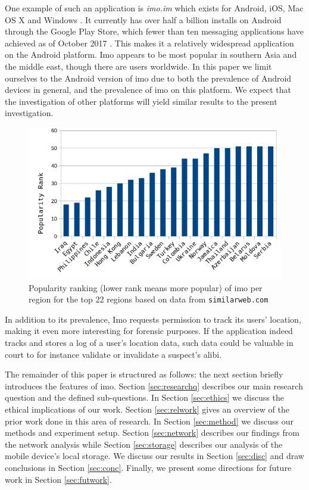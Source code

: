 \documentclass[conference]{IEEEtran}
\begin{document}
One example of such an application is {\it imo.im} which exists for Android,
iOS, Mac OS X and Windows \cite{imo}. It currently has over half a billion
installs on Android through the Google Play Store, which fewer than ten
messaging applications have achieved as of October 2017
\cite{wiki-gplay-popular}. This makes it a relatively widespread application on
the Android platform. Imo appears to be most popular in southern Asia and the
middle east, though there are users worldwide. In this paper we
limit ourselves to the Android version of imo due to both the prevalence of
Android devices in general, and the prevalence of imo on this platform. We
expect that the investigation of other platforms will yield similar results to
the present investigation.

\begin{figure}
	\includegraphics[width=\linewidth]{pop.png}
	\caption{Popularity ranking (lower rank means more popular) of imo per region for the top 22 regions based on data from \texttt{similarweb.com}}
	\label{fig:pop}
\end{figure}

In addition to its prevalence, Imo requests permission to track its users'
location, making it even more interesting for forensic purposes. If the
application indeed tracks and stores a log of a user's location data, such data
could be valuable in court to for instance validate or invalidate a suspect's
alibi.

The remainder of this paper is structured as follows: the next section briefly
introduces the features of imo. Section \ref{sec:researchq} describes our main
research question and the defined sub-questions. In Section \ref{sec:ethics} we
discuss the ethical implications of our work. Section \ref{sec:relwork} gives
an overview of the prior work done in this area of research. In Section
\ref{sec:method} we discuss our methods and experiment setup. Section
\ref{sec:network} describes our findings from the network analysis while
Section \ref{sec:storage} describes our analysis of the mobile device's local
storage. We discuss our results in Section \ref{sec:disc} and draw conclusions
in Section \ref{sec:conc}. Finally, we present some directions for future work
in Section \ref{sec:futwork}.
\end{document}
